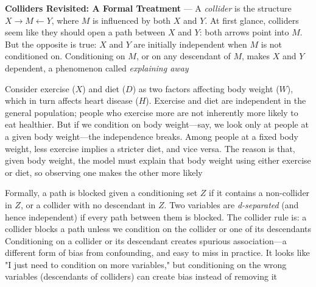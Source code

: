 
\textbf{Colliders Revisited: A Formal Treatment} --- A \emph{collider} is the
structure $X \rightarrow M \leftarrow Y$, where $M$ is influenced by both $X$ and
$Y$. At first glance, colliders seem like they should open a path between $X$ and
$Y$: both arrows point into $M$. But the opposite is true: $X$ and $Y$ are
initially independent when $M$ is not conditioned on. Conditioning on $M$, or on
any descendant of $M$, makes $X$ and $Y$ dependent, a phenomenon called \emph{explaining
away}

Consider exercise ($X$) and diet ($D$) as two factors affecting body weight ($W$),
which in turn affects heart disease ($H$). Exercise and diet are independent in
the general population; people who exercise more are not inherently more likely to
eat healthier. But if we condition on body weight—say, we look only at people at
a given body weight—the independence breaks. Among people at a fixed body weight,
less exercise implies a stricter diet, and vice versa. The reason is that, given
body weight, the model must explain that body weight using either exercise or diet,
so observing one makes the other more likely

Formally, a path is blocked given a conditioning set $Z$ if it contains a non-collider
in $Z$, or a collider with no descendant in $Z$. Two variables are \emph{d-separated}
(and hence independent) if every path between them is blocked. The collider rule
is: a collider blocks a path unless we condition on the collider or one of its descendants
Conditioning on a collider or its descendant creates spurious association—a
different form of bias from confounding, and easy to miss in practice. It looks
like "I just need to condition on more variables," but conditioning on the wrong
variables (descendants of colliders) can create bias instead of removing it


